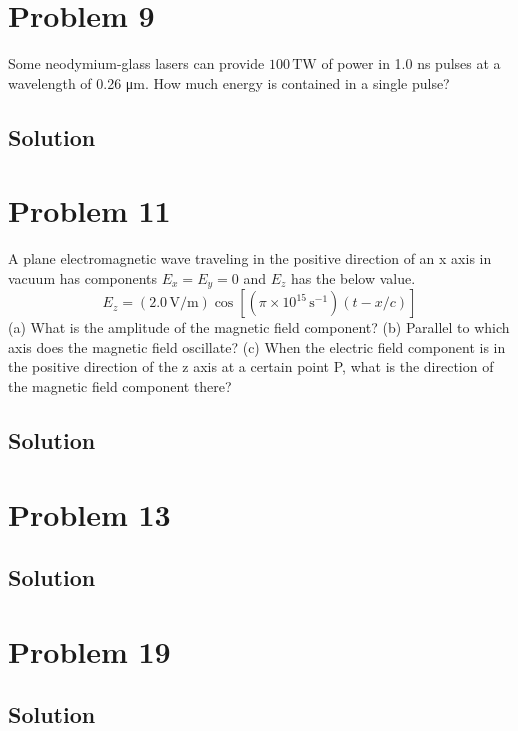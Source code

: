 \documentclass[12pt]{article}
\newcommand{\E}[1]{\times 10^{#1}}
\begin{document}
    \pagebreak
    \section{Problem 9}
        Some neodymium-glass lasers can provide $100\,\unit{\tera\watt}$ of power in 1.0 ns pulses at a wavelength of 0.26 \unit{\micro\meter}. 
        How much energy is contained in a single pulse?

        \subsection{Solution}

    \pagebreak
    \section{Problem 11}
        A plane electromagnetic wave traveling in the positive direction of an x axis in vacuum has components $E_x = E_y = 0$ and $E_z$ has the below value. 
        \begin{equation}
            E_z = (2.0\,\unit{\volt/\meter})\cos\left[ (\pi \E{15}\,\unit{\second^{-1}})(t - x/c) \right] 
        \end{equation}
        (a) What is the amplitude of the magnetic field component? 
        (b) Parallel to which axis does the magnetic field oscillate? 
        (c) When the electric field component is in the positive direction of the z axis at a certain point P, what is the direction of the magnetic field component there?

        \subsection{Solution}

    \pagebreak
    \section{Problem 13}

        \subsection{Solution}

    \pagebreak
    \section{Problem 19}

        \subsection{Solution}
\end{document}
